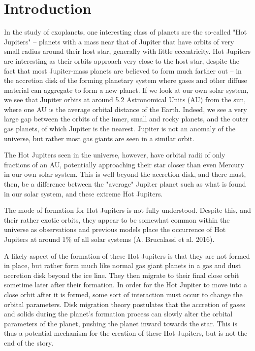 \documentclass[12pt]{article}
\begin{document}
\clearpage

\section{Introduction}

In the study of exoplanets, one interesting class of planets are the so-called "Hot Jupiters" -- planets with a mass near that of Jupiter 
that have orbits of very small radius around their host star, generally with little eccentricity.
Hot Jupiters are interesting as their orbits approach very close to the host star,
despite the fact that most Jupiter-mass planets are believed to form much farther
out -- in the accretion disk of the forming planetary system where gases 
and other diffuse material can aggregate to form a new planet. If we look at our own
solar system, we see that Jupiter orbits at around 5.2 Astronomical Units (AU) from the
sun, where one AU is the average orbital distance of the Earth. Indeed,
we see a very large gap between the orbits of the inner, small and rocky planets, and
the outer gas planets, of which Jupiter is the nearest. Jupiter is not an anomaly of
the universe, but rather most gas giants are seen in a similar orbit. %

The Hot Jupiters seen in the universe, however, have orbital 
radii of only fractions of an AU, potentially 
approaching their star closer than even Mercury in our own solar system. %
This is well beyond the accretion disk, and there must, then, be a difference between
the "average" Jupiter planet such as what is found in our solar system, and these
extreme Hot Jupiters.

The mode of formation for Hot Jupiters is not fully understood.
Despite this, and their rather exotic orbits, 
they appear to be somewhat common within the universe as observations and previous models place the occurrence of Hot Jupiters at around 1\% of all solar systems (A. Brucalassi et al. 2016).  

A likely aspect of the formation of these Hot Jupiters is that they are not formed in place, but rather form much like normal gas giant planets 
in a gas and dust accretion disk beyond the ice line. They then migrate to their final close orbit sometime later after their formation. 
In order for the Hot Jupiter to move into a close orbit after it is formed, some sort of interaction must occur to change the orbital parameters. 
Disk migration theory postulates that the accretion of gases and 
solids during the planet's formation process can slowly alter the orbital 
parameters of the planet,
pushing the planet inward towards the star.
This is thus a potential mechanism for the creation of these Hot Jupiters, but is not the end of the story.
\end{document}
